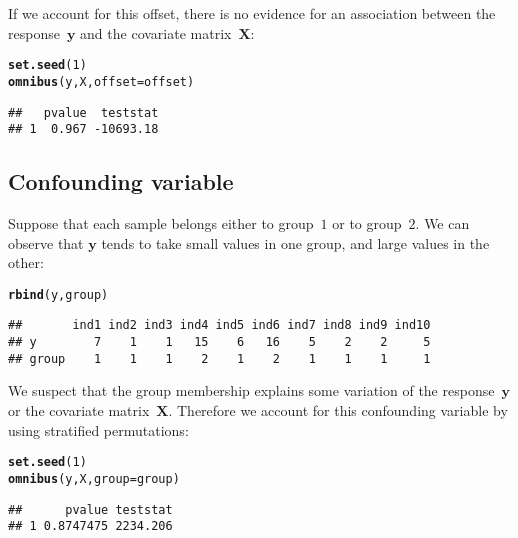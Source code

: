 \documentclass{article}\usepackage[]{graphicx}\usepackage[]{color}
\makeatletter
\newcommand{\hlnum}[1]{\textcolor[rgb]{0.686,0.059,0.569}{#1}}%
\newcommand{\hlstd}[1]{\textcolor[rgb]{0.345,0.345,0.345}{#1}}%
\newcommand{\hlkwc}[1]{\textcolor[rgb]{0.333,0.667,0.333}{#1}}%
\newcommand{\hlkwd}[1]{\textcolor[rgb]{0.737,0.353,0.396}{\textbf{#1}}}%
\newenvironment{kframe}{%
 \def\at@end@of@kframe{}%
 \ifinner\ifhmode%
  \def\at@end@of@kframe{\end{minipage}}%
  \begin{minipage}{\columnwidth}%
 \fi\fi%
 \def\FrameCommand##1{\hskip\@totalleftmargin \hskip-\fboxsep
 \colorbox{shadecolor}{##1}\hskip-\fboxsep
     \hskip-\linewidth \hskip-\@totalleftmargin \hskip\columnwidth}%
 \MakeFramed {\advance\hsize-\width
   \@totalleftmargin\z@ \linewidth\hsize
   \@setminipage}}%
 {\par\unskip\endMakeFramed%
 \at@end@of@kframe}
\newenvironment{knitrout}{}{} %
\makeatother
\begin{document}
If we account for this offset, there is no evidence for an association between the response~$\boldsymbol{y}$ and the covariate matrix~$\boldsymbol{X}$:
\begin{knitrout}
\color{fgcolor}\begin{kframe}
\begin{alltt}
\hlkwd{set.seed}\hlstd{(}\hlnum{1}\hlstd{)}
\hlkwd{omnibus}\hlstd{(y,X,}\hlkwc{offset}\hlstd{=offset)}
\end{alltt}
\begin{verbatim}
##   pvalue  teststat
## 1  0.967 -10693.18
\end{verbatim}
\end{kframe}
\end{knitrout}

\subsection{Confounding variable}
\label{TOA Confounding variable}

Suppose that each sample belongs either to group~$1$ or to group~$2$. We can observe that $\boldsymbol{y}$ tends to take small values in one group, and large values in the other:
\begin{knitrout}
\color{fgcolor}\begin{kframe}
\begin{alltt}
\hlkwd{rbind}\hlstd{(y,group)}
\end{alltt}
\begin{verbatim}
##       ind1 ind2 ind3 ind4 ind5 ind6 ind7 ind8 ind9 ind10
## y        7    1    1   15    6   16    5    2    2     5
## group    1    1    1    2    1    2    1    1    1     1
\end{verbatim}
\end{kframe}
\end{knitrout}

We suspect that the group membership explains some variation of the response~$\boldsymbol{y}$ or the covariate matrix~$\boldsymbol{X}$. Therefore we account for this confounding variable by using stratified permutations:
\begin{knitrout}
\color{fgcolor}\begin{kframe}
\begin{alltt}
\hlkwd{set.seed}\hlstd{(}\hlnum{1}\hlstd{)}
\hlkwd{omnibus}\hlstd{(y,X,}\hlkwc{group}\hlstd{=group)}
\end{alltt}
\begin{verbatim}
##      pvalue teststat
## 1 0.8747475 2234.206
\end{verbatim}
\end{kframe}
\end{knitrout}
\end{document}
